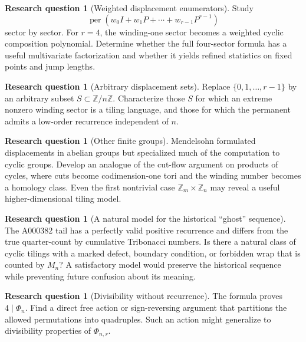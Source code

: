 \documentclass[11pt,letterpaper]{article}
\numberwithin{equation}{section}
\theoremstyle{definition}
\newtheorem{question}[theorem]{Research question}
\newcommand{\Z}{\mathbb Z}
\newcommand{\Zn}{\Z/n\Z}
\newcommand{\per}{\operatorname{per}}
\begin{document}
\begin{question}[Weighted displacement enumerators]
Study
\[
 \per\!\left(w_0I+w_1P+\cdots+w_{r-1}P^{r-1}\right)
\]
sector by sector.  For $r=4$, the winding-one sector becomes a weighted cyclic
composition polynomial.  Determine whether the full four-sector formula has a
useful multivariate factorization and whether it yields refined statistics on
fixed points and jump lengths.
\end{question}

\begin{question}[Arbitrary displacement sets]
Replace $\{0,1,\dots,r-1\}$ by an arbitrary subset $S\subset\Zn$.  Characterize
those $S$ for which an extreme nonzero winding sector is a tiling language, and
those for which the permanent admits a low-order recurrence independent of
$n$.
\end{question}

\begin{question}[Other finite groups]
Mendelsohn formulated displacements in abelian groups but specialized much of
the computation to cyclic groups.  Develop an analogue of the cut-flow
argument on products of cycles, where cuts become codimension-one tori and the
winding number becomes a homology class.  Even the first nontrivial case
$\Z_m\times\Z_n$ may reveal a useful higher-dimensional tiling model.
\end{question}

\begin{question}[A natural model for the historical ``ghost'' sequence]
The A000382 tail has a perfectly valid positive recurrence and differs from the
true quarter-count by cumulative Tribonacci numbers.  Is there a natural class
of cyclic tilings with a marked defect, boundary condition, or forbidden wrap
that is counted by $M_n$?  A satisfactory model would preserve the historical
sequence while preventing future confusion about its meaning.
\end{question}

\begin{question}[Divisibility without recurrence]
The formula proves $4\mid\Phi_n$.  Find a direct free action or sign-reversing
argument that partitions the allowed permutations into quadruples.  Such an
action might generalize to divisibility properties of $\Phi_{n,r}$.
\end{question}
\end{document}
